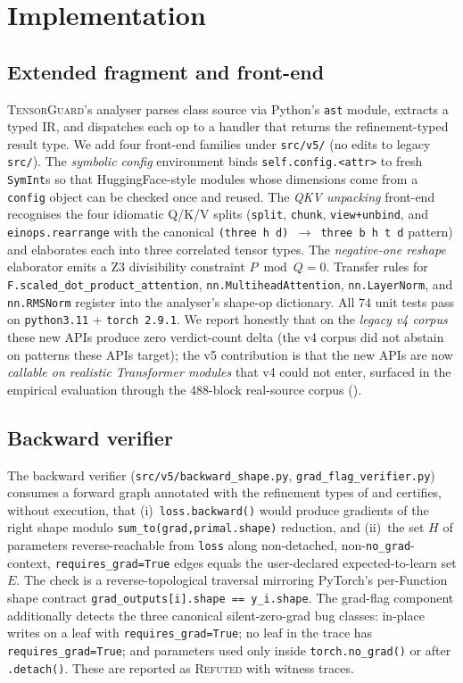 \section{Implementation}\label{sec:impl}

\subsection{Extended fragment and front-end}
\label{sec:impl-fragment}
\textsc{TensorGuard}'s analyser parses class source via Python's
\texttt{ast} module, extracts a typed IR, and dispatches each
op to a handler that returns the refinement-typed result type.
We add four front-end families under \texttt{src/v5/} (no edits
to legacy \texttt{src/}). The \emph{symbolic config} environment
binds \texttt{self.config.<attr>} to fresh \texttt{SymInt}s so
that HuggingFace-style modules whose dimensions come from a
\texttt{config} object can be checked once and reused. The
\emph{QKV unpacking} front-end recognises the four idiomatic
Q/K/V splits (\texttt{split}, \texttt{chunk},
\texttt{view+unbind}, and \texttt{einops.rearrange} with the
canonical \texttt{(three h d) $\to$ three b h t d} pattern) and
elaborates each into three correlated tensor types. The
\emph{negative-one reshape} elaborator emits a Z3 divisibility
constraint $P\bmod Q=0$. Transfer rules for
\texttt{F.scaled\_dot\_product\_attention},
\texttt{nn.MultiheadAttention}, \texttt{nn.LayerNorm}, and
\texttt{nn.RMSNorm} register into the analyser's shape-op
dictionary. All $74$ unit tests pass on \texttt{python3.11} +
\texttt{torch~2.9.1}. We report honestly that on the \emph{legacy
v4 corpus} these new APIs produce zero verdict-count delta (the
v4 corpus did not abstain on patterns these APIs target); the
v5 contribution is that the new APIs are now \emph{callable on
realistic Transformer modules} that v4 could not enter, surfaced
in the empirical evaluation through the 488-block real-source
corpus ().

\subsection{Backward verifier}\label{sec:impl-backward}
The backward verifier (\texttt{src/v5/backward\_shape.py},
\texttt{grad\_flag\_verifier.py}) consumes a forward graph
annotated with the refinement types of  and
certifies, without execution, that (i)~\texttt{loss.backward()}
would produce gradients of the right shape modulo
\texttt{sum\_to(grad,primal.shape)} reduction, and (ii)~the set
$H$ of parameters reverse-reachable from \texttt{loss} along
non-detached, non-\texttt{no\_grad}-context,
\texttt{requires\_grad=True} edges equals the user-declared
expected-to-learn set $E$. The check is a reverse-topological
traversal mirroring PyTorch's per-Function shape contract
\verb|grad_outputs[i].shape == y_i.shape|. The grad-flag
component additionally detects the three canonical
silent-zero-grad bug classes: in-place writes on a leaf with
\texttt{requires\_grad=True}; no leaf in the trace has
\texttt{requires\_grad=True}; and parameters used only inside
\texttt{torch.no\_grad()} or after \texttt{.detach()}. These
are reported as \textsc{Refuted} with witness traces.

